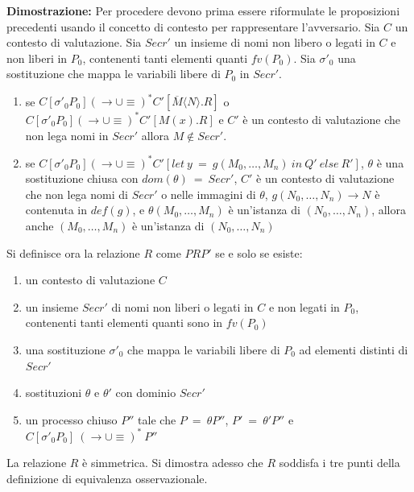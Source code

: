 \documentclass[12pt]{article}
\begin{document}
\textbf{Dimostrazione:} Per procedere devono prima essere riformulate le proposizioni precedenti usando il concetto di contesto per rappresentare l'avversario. Sia $C$ un contesto di valutazione. Sia $Secr'$ un insieme di nomi non libero o legati in $C$ e non liberi in $P_0$, contenenti tanti elementi quanti $fv(P_0)$. Sia $\sigma'_0$ una sostituzione che mappa le variabili libere di $P_0$ in $Secr'$.
\begin{enumerate}
    \item se $C[\sigma'_0 P_0] (\rightarrow \cup \equiv)^* C'[\overline{M} \langle N \rangle . R]$ o $C[\sigma'_0 P_0] (\rightarrow \cup \equiv)^* C'[M(x).R]$ e $C'$ è un contesto di valutazione che non lega nomi in $Secr'$ allora $M \notin Secr'$.
    \item se $C[\sigma'_0 P_0] (\rightarrow \cup \equiv)^* C'[let\ y\ =\ g(M_0,\dots,M_n)\ in\ Q'\ else\ R']$, $\theta$ è una sostituzione chiusa con $dom(\theta)\ =\ Secr'$, $C'$ è un contesto di valutazione che non lega nomi di $Secr'$ o nelle immagini di $\theta$, $g(N_0,\dots,N_n) \rightarrow N$ è contenuta in $def(g)$, e $\theta (M_0,\dots,M_n)$ è un'istanza di $(N_0,\dots,N_n)$, allora anche $(M_0,\dots,M_n)$ è un'istanza di $(N_0,\dots,N_n)$ 
\end{enumerate}
Si definisce ora la relazione $R$ come $PRP'$ se e solo se esiste:\\
\begin{enumerate}
    \item un contesto di valutazione $C$
    \item un insieme $Secr'$ di nomi non liberi o legati in $C$ e non legati in $P_0$, contenenti tanti elementi quanti sono in $fv(P_0)$
    \item una sostituzione $\sigma'_0$ che mappa le variabili libere di $P_0$ ad elementi distinti di $Secr'$
    \item sostituzioni $\theta$ e $\theta'$ con dominio $Secr'$
    \item un processo chiuso $P''$ tale che $P\ =\ \theta P''$, $P'\ =\ \theta'P''$ e\\ $C[\sigma'_0 P_0]\ (\rightarrow \cup \equiv)^*\ P''$  
\end{enumerate}
La relazione $R$ è simmetrica. Si dimostra adesso che $R$ soddisfa i tre punti della definizione di equivalenza osservazionale.\\
\end{document}
